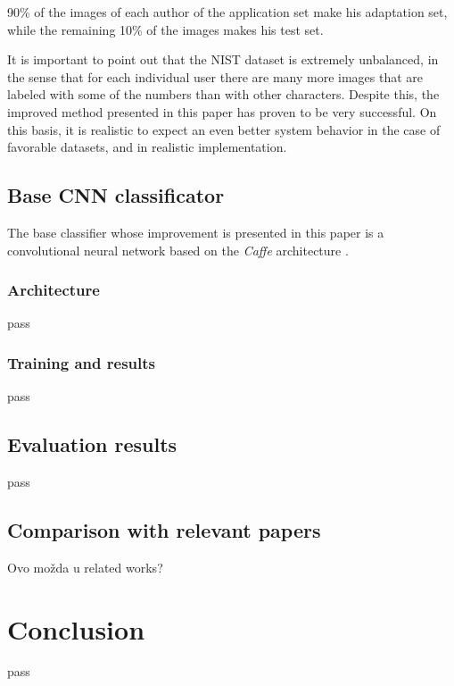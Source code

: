 \documentclass{article}
\begin{document}
90\% of the images of each author of the application set make his adaptation set, while the remaining 10\% of the images makes his test set. 

It is important to point out that the NIST dataset is extremely unbalanced, in the sense that for each individual user there are many more images that are 
labeled with some of the numbers than with other characters. 
Despite this, the improved method presented in this paper has proven to be very successful. 
On this basis, it is realistic to expect an even better system behavior in the case of favorable datasets, and in realistic implementation. 

\subsection{Base CNN classificator}

The base classifier whose improvement is presented in this paper is a convolutional neural network based on the \textit{Caffe} architecture \citet{caffe}. 

\subsubsection{Architecture}
pass 

\subsubsection{Training and results}
pass

\subsection{Evaluation results}
pass

\subsection{Comparison with relevant papers}
Ovo možda u related works?

\section{Conclusion}
pass 

\small
\end{document}
